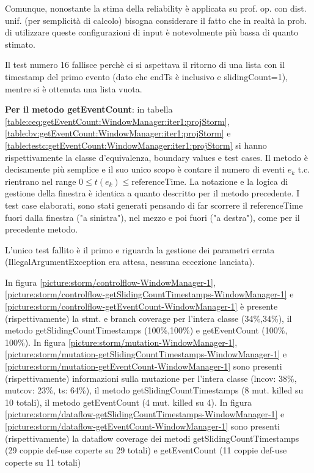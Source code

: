 \documentclass[10pt, a4paper]{article}
\newcommand{\gettablelabel}[5]{table:#1:#2:#3:iter#4:proj#5}
\newcommand{\getpicturelabel}[1]{picture:#1}
\def\storm{Storm}
\begin{document}
	Comunque, nonostante la stima della reliability è applicata su 
	prof. op. con dist. unif. (per semplicità di calcolo) bisogna considerare il fatto che in realtà la prob. 
	di utilizzare queste configurazioni di input è notevolmente più bassa di quanto stimato.
	
	Il test numero 16 fallisce perchè ci si aspettava il ritorno di una lista con il timestamp del primo evento 
	(dato che endTs è inclusivo e slidingCount=1), mentre si è ottenuta una lista vuota.
	
	\textbf{Per il metodo getEventCount}: in tabella 
	\ref{\gettablelabel{ceq}{getEventCount}{WindowManager}{1}{\storm}}, 
	\ref{\gettablelabel{bv}{getEventCount}{WindowManager}{1}{\storm}} e 
	\ref{\gettablelabel{testc}{getEventCount}{WindowManager}{1}{\storm}} si hanno rispettivamente la
	classe d'equivalenza, boundary values e test cases. Il metodo è decisamente più semplice e il suo unico scopo
	è contare il numero di eventi $e_k$ t.c. rientrano nel range $0 \le t(e_k) \le \text{referenceTime}$.
	La notazione e la logica di gestione della finestra è identica a quanto descritto per il metodo precedente.
	I test case elaborati, sono stati generati pensando di far scorrere il 
	referenceTime fuori dalla finestra ("a sinistra"), nel mezzo e poi fuori ("a destra"), come per il precedente
	metodo.
	
	L'unico test fallito è il primo e riguarda la gestione dei parametri errata 
	(IllegalArgumentException era attesa, nessuna eccezione lanciata).
	
	In figura \ref{\getpicturelabel{storm/controlflow-WindowManager-1}}, 
	\ref{\getpicturelabel{storm/controlflow-getSlidingCountTimestamps-WindowManager-1}} e
	\ref{\getpicturelabel{storm/controlflow-getEventCount-WindowManager-1}} 
	è presente (rispettivamente) la stmt. e branch coverage
	per l'intera classe (34\%,34\%), il metodo getSlidingCountTimestamps (100\%,100\%) e getEventCount 
	(100\%, 100\%). In figura 
	\ref{\getpicturelabel{storm/mutation-WindowManager-1}}, 
	\ref{\getpicturelabel{storm/mutation-getSlidingCountTimestamps-WindowManager-1}} e 
	\ref{\getpicturelabel{storm/mutation-getEventCount-WindowManager-1}} sono presenti (rispettivamente)
	informazioni sulla
	mutazione per l'intera classe (lncov: 38\%, mutcov: 23\%, ts: 64\%), 
	il metodo getSlidingCountTimestamps (8 mut. killed su 10 totali), 
	il metodo getEventCount (4 mut. killed su 4).
	In figura 
	\ref{\getpicturelabel{storm/dataflow-getSlidingCountTimestamps-WindowManager-1}} e 
	\ref{\getpicturelabel{storm/dataflow-getEventCount-WindowManager-1}} sono presenti (rispettivamente) la 
	dataflow coverage dei metodi getSlidingCountTimestamps (29 coppie def-use coperte su 29 totali) 
	e getEventCount (11 coppie def-use coperte su 11 totali)
	
\end{document}
